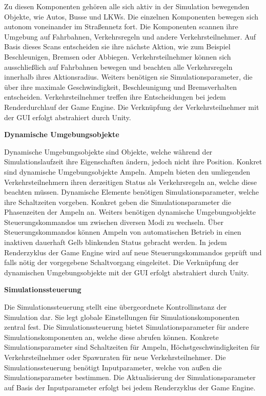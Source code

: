 Zu diesen Komponenten gehören alle sich aktiv in der Simulation bewegenden Objekte, wie Autos, Busse und LKWs. Die einzelnen Komponenten bewegen sich autonom voneinander im Straßennetz fort. Die Komponenten scannen ihre Umgebung auf Fahrbahnen, Verkehrsregeln und andere Verkehrsteilnehmer. Auf Basis dieses Scans entscheiden sie ihre nächste Aktion, wie zum Beispiel Beschleunigen, Bremsen oder Abbiegen. Verkehrsteilnehmer können sich ausschließlich auf Fahrbahnen bewegen und beachten alle Verkehrsregeln innerhalb ihres Aktionsradius. Weiters benötigen sie Simulationsparameter, die über ihre maximale Geschwindigkeit, Beschleunigung und Bremsverhalten entscheiden. Verkehrsteilnehmer treffen ihre Entscheidungen bei jedem Renderdurchlauf der Game Engine. Die Verknüpfung der Verkehrsteilnehmer mit der GUI erfolgt abstrahiert durch Unity.

\begin{flushleft}
\textbf{Dynamische Umgebungsobjekte}
\end{flushleft}
\vspace{-0.3 cm}

Dynamische Umgebungsobjekte sind Objekte, welche während der Simulationslaufzeit ihre Eigenschaften ändern, jedoch nicht ihre Position. Konkret sind dynamische Umgebungsobjekte Ampeln. Ampeln bieten den umliegenden Verkehrsteilnehmern ihren derzeitigen Status als Verkehrsregeln an, welche diese beachten müssen. Dynamische Elemente benötigen Simulationsparameter, welche ihre Schaltzeiten vorgeben. Konkret geben die Simulationsparameter die Phasenzeiten der Ampeln an. Weiters benötigen dynamische Umgebungsobjekte Steuerungskommandos um zwischen diversen Modi zu wechseln. Über Steuerungskommandos können Ampeln von automatischen Betrieb in einen inaktiven dauerhaft Gelb blinkenden Status gebracht werden. In jedem Renderzyklus der Game Engine wird auf neue Steuerungskommandos geprüft und falls nötig der vorgegebene Schaltvorgang eingeleitet. Die Verknüpfung der dynamischen Umgebungsobjekte mit der GUI erfolgt abstrahiert durch Unity.

\begin{flushleft}
\textbf{Simulationssteuerung}
\end{flushleft}
\vspace{-0.3 cm}

Die Simulationssteuerung stellt eine übergeordnete Kontrollinstanz der Simulation dar. Sie legt globale Einstellungen für Simulationskomponenten zentral fest. Die Simulationssteuerung bietet Simulationsparameter für andere Simulationskomponenten an, welche diese abrufen können. Konkrete Simulationsparameter sind Schaltzeiten für Ampeln, Höchstgeschwindigkeiten für Verkehrsteilnehmer oder Spawnraten für neue Verkehrsteilnehmer. Die Simulationssteuerung benötigt Inputparameter, welche von außen die Simulationsparameter bestimmen. Die Aktualisierung der Simulationsparameter auf Basis der Inputparameter erfolgt bei jedem Renderzyklus der Game Engine.

